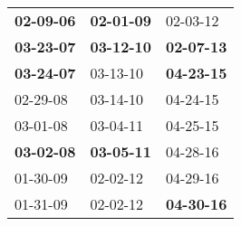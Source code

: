 \begin{supertabular}{p{0.33\columnwidth}p{0.33\columnwidth}p{0.33\columnwidth}}
 \textbf{02-09-06\textsuperscript{}} &  \textbf{02-01-09\textsuperscript{}} &           02-03-12\textsuperscript{} \\
 \textbf{03-23-07\textsuperscript{}} &  \textbf{03-12-10\textsuperscript{}} &  \textbf{02-07-13\textsuperscript{}} \\
 \textbf{03-24-07\textsuperscript{}} &           03-13-10\textsuperscript{} &  \textbf{04-23-15\textsuperscript{}} \\
          02-29-08\textsuperscript{} &           03-14-10\textsuperscript{} &           04-24-15\textsuperscript{} \\
          03-01-08\textsuperscript{} &           03-04-11\textsuperscript{} &           04-25-15\textsuperscript{} \\
 \textbf{03-02-08\textsuperscript{}} &  \textbf{03-05-11\textsuperscript{}} &           04-28-16\textsuperscript{} \\
          01-30-09\textsuperscript{} &           02-02-12\textsuperscript{} &           04-29-16\textsuperscript{} \\
          01-31-09\textsuperscript{} &           02-02-12\textsuperscript{} &  \textbf{04-30-16\textsuperscript{}} \\
\end{supertabular}
